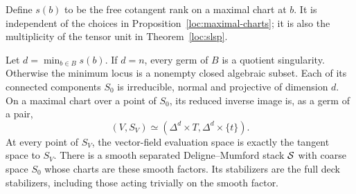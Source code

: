 Define $s(b)$ to be the free cotangent rank on a maximal chart at $b$.
It is independent of the choices in Proposition~\ref{loc:maximal-charts}; it
is also the multiplicity of the tensor unit in Theorem~\ref{loc:slsp}.

\begin{proposition}\label{str:minimum}
Let $d=\min_{b\in B}s(b)$.  If $d=n$, every germ of $B$ is a quotient
singularity.  Otherwise the minimum locus is a nonempty closed algebraic
subset.  Each of its connected components $S_0$ is irreducible, normal
and projective of dimension $d$.  On a maximal chart over a point of
$S_0$, its reduced inverse image is, as a germ of a pair,
\begin{equation}\label{str:minimum-pair}
 (V,S_V)\simeq(\Delta^d\times T,\Delta^d\times\{t\}).
\end{equation}
At every point of $S_V$, the vector-field evaluation space is exactly
the tangent space to $S_V$.
There is a smooth separated Deligne--Mumford stack $\mathcal S$ with coarse
space $S_0$ whose charts are these smooth factors.  Its stabilizers are
the full deck stabilizers, including those acting trivially on the
smooth factor.
\end{proposition}

